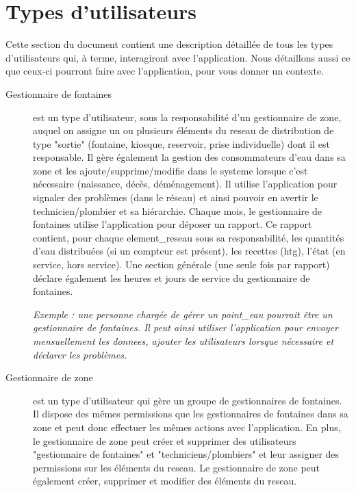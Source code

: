 \documentclass[a4paper, 11pt]{article}
\begin{document}
\section{Types d'\glspl{utilisateur}}
\label{users}
Cette section du document contient une description détaillée de tous les types d'\glspl{utilisateur} qui, à terme, interagiront avec l'\gls{application}. Nous détaillons aussi ce que ceux-ci pourront faire avec l'\gls{application}, pour vous donner un contexte.

  \begin{description}
    \item[Gestionnaire de \glspl{fontaine}] est un type d'\gls{utilisateur}, sous la responsabilité d'un gestionnaire de zone, auquel on assigne un ou plusieurs éléments du \gls{reseau} de distribution de type "sortie" (\gls{fontaine}, \gls{kiosque}, \gls{reservoir}, prise individuelle) dont il est responsable.
    Il gère également la gestion des \glspl{consommateur} d'eau dans sa \gls{zone} et les ajoute/supprime/modifie dans le \gls{systeme} lorsque c'est nécessaire (naissance, décès, déménagement).
    Il utilise l'\gls{application} pour signaler des problèmes (dans le réseau) et ainsi pouvoir en avertir le technicien/plombier et sa hiérarchie. Chaque mois, le gestionnaire de \glspl{fontaine} utilise l'\gls{application} pour déposer un rapport. Ce rapport contient, pour chaque \gls{element_reseau} sous sa responsabilité, les quantités d'eau distribuées (si un compteur est présent), les recettes (\gls{htg}), l'état (en service, hors service). Une section générale (une seule fois par rapport) déclare également les heures et jours de service du gestionnaire de \glspl{fontaine}.

    \emph{Exemple : une personne chargée de gérer un \gls{point_eau} pourrait être un gestionnaire de \glspl{fontaine}. Il peut ainsi utiliser l'\gls{application} pour envoyer mensuellement les \glspl{donnee}, ajouter les \glspl{utilisateur} lorsque nécessaire et déclarer les problèmes.}

    \item[Gestionnaire de \gls{zone}] est un type d'\gls{utilisateur} qui gère un groupe de gestionnaires de \glspl{fontaine}. Il dispose des mêmes \glspl{permission} que les gestionnaires de \glspl{fontaine} dans sa \gls{zone} et peut donc effectuer les mêmes actions avec l'\gls{application}. En plus, le gestionnaire de \gls{zone} peut créer et supprimer des \glspl{utilisateur} "gestionnaire de \glspl{fontaine}" et  "techniciens/plombiers" et leur assigner des \glspl{permission} sur les éléments du \gls{reseau}. Le gestionnaire de \gls{zone} peut également créer, supprimer et modifier des éléments du \gls{reseau}.


\end{description}
\end{document}
